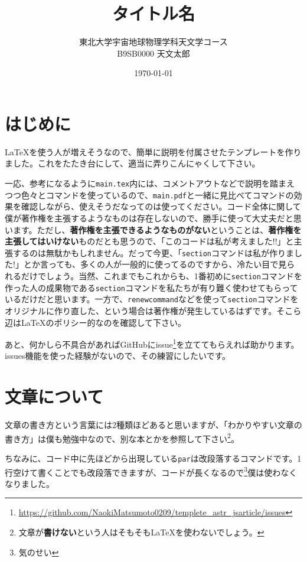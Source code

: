 \documentclass[a4paper,papersize,uplatex,dvipdfmx,10pt]{jsarticle}
\title{タイトル名}
\author{東北大学宇宙地球物理学科天文学コース\\B9SB0000\,\,天文太郎}
\date{\today}
\newcommand{\bs}{\symbol{92}} %
\begin{document}
\maketitle
\nocite{*}

\section{はじめに} %
\LaTeX を使う人が増えそうなので、簡単に説明を付属させたテンプレートを作りました。これをたたき台にして、適当に弄りこんにゃくして下さい。\par
一応、参考になるように\texttt{main.tex}内には、コメントアウトなどで説明を踏まえつつ色々とコマンドを使っているので、\texttt{main.pdf}と一緒に見比べてコマンドの効果を確認しながら、使えそうだなってのは使ってください。コード全体に関して僕が著作権を主張するようなものは存在しないので、勝手に使って大丈夫だと思います。ただし、\textbf{著作権を主張できるようなものがない}ということは、\textbf{著作権を主張してはいけない}ものだとも思うので、「このコードは私が考えました!!」と主張するのは無駄かもしれません。だって今更、「\texttt{\bs section}コマンドは私が作りました!」とか言っても、多くの人が一般的に使ってるのですから、冷たい目で見られるだけでしょう。当然、これまでもこれからも、1番初めに\texttt{\bs section}コマンドを作った人の成果物である\texttt{\bs section}コマンドを私たちが有り難く使わせてもらっているだけだと思います。一方で、\texttt{\bs renewcommand}などを使って\texttt{\bs section}コマンドをオリジナルに作り直した、という場合は著作権が発生しているはずです。そこら辺は\LaTeX のポリシー的なのを確認して下さい。\par
あと、何かしら不具合があればGitHubにissue\footnote{\url{https://github.com/NaokiMatsumoto0209/templete_astr_jsarticle/issues}}を立ててもらえれば助かります。issues機能を使った経験がないので、その練習にしたいです。

\section{文章について} %
文章の書き方という言葉には2種類ほどあると思いますが、「わかりやすい文章の書き方」は僕も勉強中なので、別な本とかを参照して下さい\footnote{文章が\textbf{書けない}という人はそもそも\LaTeX を使わないでしょう。}。\par
ちなみに、コード中に先ほどから出現している\texttt{\bs par}は改段落するコマンドです。1行空けて書くことでも改段落できますが、コードが長くなるので\footnote{気のせい}僕は使わなくなりました。\par
\end{document}
